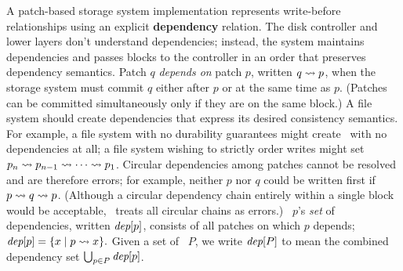 A patch-based storage system implementation represents write-before
 relationships using an explicit \textbf{dependency} relation.
%
The disk controller and lower layers don't understand dependencies; instead,
 the system
 maintains dependencies and passes blocks to the controller in an
 order that preserves dependency semantics.
%
Patch $q$ \emph{depends on} patch $p$, written $q \leadsto p$,
 when the storage system must commit $q$ either after $p$ or at the same
 time as $p$.
%
(Patches can be committed simultaneously only if they are on the same block.)
%
A file system should create dependencies that express its desired consistency
 semantics.
%
For example, a file system with no durability
 guarantees might create \patches\ with no dependencies at all;
%
a file system wishing to strictly order writes might set
 $p_n \leadsto p_{n-1} \leadsto \cdots \leadsto p_1$.
%
%
%
Circular dependencies among patches cannot be resolved and are therefore
 errors;  for example, neither $p$ nor $q$ could be written first
 if $p \leadsto q \leadsto p$.
%
(Although a circular dependency chain entirely within a single block would be
 acceptable, \Kudos\ treats all circular chains as errors.)
%
\Patch\ $p$'s \emph{set} of dependencies, written $\textit{dep}[p]$, consists
 of all patches on which $p$ depends;
%
\( \textit{dep}[p] = \{ x \mid p \leadsto x \}. \)
%
Given a set of \patches\ $P$, we write $\textit{dep}[P]$ to mean the
 combined dependency set $\bigcup_{p\in P} \textit{dep}[p]$. 


